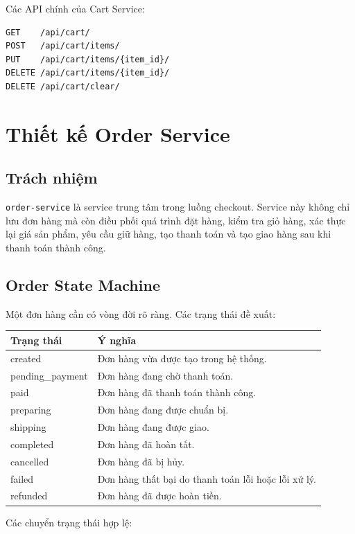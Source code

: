 Các API chính của Cart Service:

\begin{lstlisting}[style=code]
GET    /api/cart/
POST   /api/cart/items/
PUT    /api/cart/items/{item_id}/
DELETE /api/cart/items/{item_id}/
DELETE /api/cart/clear/
\end{lstlisting}

\section{Thiết kế Order Service}

\subsection{Trách nhiệm}

\texttt{order-service} là service trung tâm trong luồng checkout. Service này không chỉ lưu đơn hàng mà còn điều phối quá trình đặt hàng, kiểm tra giỏ hàng, xác thực lại giá sản phẩm, yêu cầu giữ hàng, tạo thanh toán và tạo giao hàng sau khi thanh toán thành công.

\subsection{Order State Machine}

Một đơn hàng cần có vòng đời rõ ràng. Các trạng thái đề xuất:

\begin{longtable}{|p{4cm}|p{9cm}|}
\hline
\textbf{Trạng thái} & \textbf{Ý nghĩa} \\
\hline
created & Đơn hàng vừa được tạo trong hệ thống. \\
\hline
pending\_payment & Đơn hàng đang chờ thanh toán. \\
\hline
paid & Đơn hàng đã thanh toán thành công. \\
\hline
preparing & Đơn hàng đang được chuẩn bị. \\
\hline
shipping & Đơn hàng đang được giao. \\
\hline
completed & Đơn hàng đã hoàn tất. \\
\hline
cancelled & Đơn hàng đã bị hủy. \\
\hline
failed & Đơn hàng thất bại do thanh toán lỗi hoặc lỗi xử lý. \\
\hline
refunded & Đơn hàng đã được hoàn tiền. \\
\hline
\end{longtable}

Các chuyển trạng thái hợp lệ:

